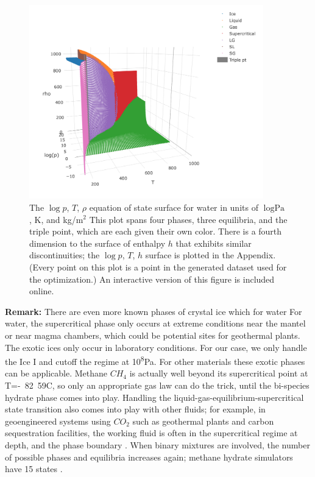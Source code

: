 \documentclass[AMA,STIX1COL]{WileyNJD-v2}
\begin{document}
\begin{figure}
\centering
\includegraphics[width=4in]{../figures/water_eos.png}
\caption{\label{fig:pTrho} The $\log{p}$, $T$, $\rho$ equation of
  state surface for water in units of $\log{\text{Pa}}$, K, and \si{}{kg/m$^2$} This plot spans four phases, three
  equilibria, and the triple point, which are each given their own color.
  There is a fourth dimension to the surface of enthalpy $h$ that exhibits
  similar discontinuities; the $\log{p}$, $T$, $h$ surface is plotted
  in the Appendix. (Every point on this plot is a point in the
  generated dataset used for the optimization.) An interactive version
of this figure is included online.}
\end{figure}


{\bf Remark:} There are even more known phases of crystal ice which for water
For water, the supercritical phase only occurs at extreme conditions
near the mantel or near magma chambers, which could be potential sites
for geothermal plants\cite{elders_science_2010}. The exotic ices only occur in
laboratory conditions\cite{water_revised_2009}. For our case, we only handle the Ice I and cutoff the
regime at \si{10^8}{Pa}. For other materials these exotic phases can be
applicable. Methane $CH_4$ is actually well beyond its supercritical
point at T=\si{-82.59}{C}\cite{the_engineering_toolbox_methane_2008}, so only an appropriate gas law can do the trick, until
the bi-species hydrate phase comes into play. Handling the
liquid-gas-equilibrium-supercritical state transition also comes into
play with other fluids; for example, in geoengineered systems using
$CO_2$ such as geothermal plants and carbon sequestration facilities, the
working fluid is often in the supercritical regime at depth, and the
phase boundary \cite{pruess_feasibility_2006,oldenburg_migration_2006}. 
When binary mixtures are involved, the number of possible phases and
equilibria increases again; methane hydrate simulators have 15
states \cite{moridis_simulation_2019}.
\end{document}
